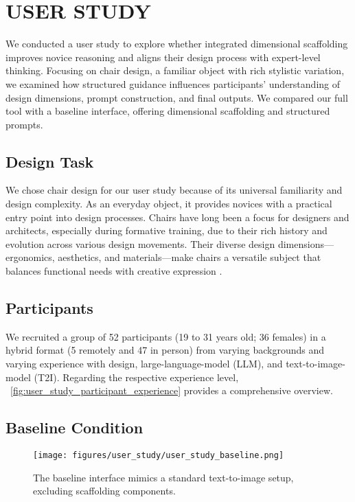 \section{USER STUDY}
We conducted a user study to explore whether integrated dimensional scaffolding improves novice reasoning and aligns their design process with expert-level thinking. Focusing on chair design, a familiar object with rich stylistic variation, we examined how structured guidance influences participants' understanding of design dimensions, prompt construction, and final outputs. We compared our full tool with a baseline interface, offering dimensional scaffolding and structured prompts.

\subsection{Design Task}
We chose chair design for our user study because of its universal familiarity and design complexity. As an everyday object, it provides novices with a practical entry point into design processes. Chairs have long been a focus for designers and architects, especially during formative training, due to their rich history and evolution across various design movements. Their diverse design dimensions—ergonomics, aesthetics, and materials—make chairs a versatile subject that balances functional needs with creative expression \cite{fiell2005chairs}.

\subsection{Participants}

We recruited a group of 52 participants (19 to 31 years old; 36 females) in a hybrid format (5 remotely and 47 in person) from varying backgrounds and varying experience with design, large-language-model (LLM), and text-to-image-model (T2I). Regarding the respective experience level, ~\autoref{fig:user_study_participant_experience} provides a comprehensive overview.

\subsection{Baseline Condition} 

\begin{figure}[htbp]
    \centering
    \texttt{[image: figures/user\_study/user\_study\_baseline.png]} 
    \caption{The baseline interface mimics a standard text-to-image setup, excluding scaffolding components.}
    \label{fig:user_study_baseline}
\end{figure}

